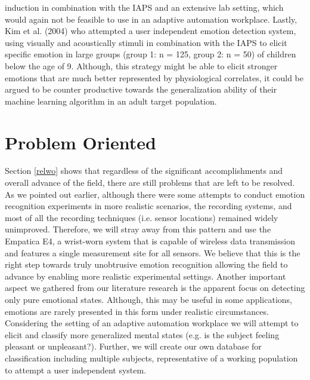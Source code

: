 induction in combination with the IAPS and an extensive lab setting, which would again not be feasible to use in an adaptive automation workplace. Lastly, Kim et al. (2004) who attempted a user independent emotion detection system, using visually and acoustically stimuli in combination with the IAPS to elicit specific emotion in large groups (group 1: n = 125, group 2: n = 50) of children below the age of 9. Although, this strategy might be able to elicit stronger emotions that are much better represented by physiological correlates, it could be argued to be counter productive towards the generalization ability of their machine learning algorithm in an adult target population. 

\section{Problem Oriented}
Section \ref{relwo} shows that regardless of the significant accomplishments and overall advance of the field, there are still problems that are left to be resolved. As we pointed out earlier, although there were some attempts to conduct emotion recognition experiments in more realistic scenarios, the recording systems, and most of all the recording techniques (i.e. sensor locations) remained widely unimproved. Therefore, we will stray away from this pattern and use the Empatica E4, a wrist-worn system that is capable of wireless data transmission and features a single measurement site for all sensors. We believe that this is the right step towards truly unobtrusive emotion recognition allowing the field to advance by enabling more realistic experimental settings.
Another important aspect we gathered from our literature research is the apparent focus on detecting only pure emotional states. Although, this may be useful in some applications, emotions are rarely presented in this form under realistic circumstances. Considering the setting of an adaptive automation workplace we will attempt to elicit and classify more generalized mental states (e.g. is the subject feeling pleasant or unpleasant?).
Further, we will create our own database for classification including multiple subjects, representative of a working population to attempt a user independent system.
